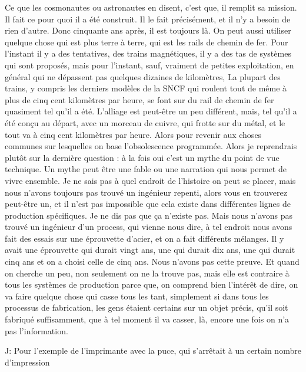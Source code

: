 \begin{description}
Ce que les cosmonautes ou astronautes en disent, c'est que, il remplit sa mission. Il fait ce pour quoi il a été construit. Il le fait précisément, et il n'y a besoin de rien d'autre. Donc cinquante ans après, il est toujours là. 
On peut aussi utiliser quelque chose qui est plus terre à terre, qui est les rails de chemin de fer. Pour l'instant il y a des tentatives, des trains magnétiques, il y a des tas de systèmes qui sont proposés, mais pour l'instant, sauf, vraiment de petites exploitation, en général qui ne dépassent pas quelques dizaines de kilomètres, La plupart des trains, y compris les derniers modèles de la SNCF qui roulent tout de même à plus de cinq cent kilomètres par heure, se font sur du rail de chemin de fer quasiment tel qu'il a été. L'alliage est peut-être un peu différent, mais, tel qu'il a été conçu au départ, avec un morceau de cuivre, qui frotte sur du métal, et le tout va à  cinq cent kilomètres par heure. 
Alors pour revenir aux choses communes sur lesquelles on base l'obsolescence programmée. Alors je reprendrais plutôt sur la dernière question : à la fois oui c'est un mythe du point de vue technique. Un mythe peut être une fable ou une narration qui nous permet de vivre ensemble. Je ne sais pas à quel endroit de l'histoire on peut se placer, mais nous n'avons toujours pas trouvé un ingénieur repenti, alors vous en trouverez peut-être un, et il n'est pas impossible que cela existe dans différentes lignes de production spécifiques. Je ne dis pas que ça n'existe pas. Mais nous n'avons pas trouvé un ingénieur d'un process, qui vienne nous dire, à tel endroit nous avons fait des essais sur une éprouvette d'acier, et on a fait différents mélanges. Il y avait une éprouvette qui durait vingt ans, une qui durait dix ans, une qui durait cinq ans et on a choisi celle de cinq ans. Nous n'avons pas cette  preuve. Et quand on cherche un peu, non seulement on ne la trouve pas, mais elle est contraire à tous les systèmes de production parce que, on comprend bien l’intérêt de dire, on va faire quelque chose qui casse tous les tant, simplement si dans tous les processus de fabrication, les gens étaient certains sur un objet précis, qu'il soit fabriqué suffisamment, que à tel moment il va casser, là, encore une fois on n'a pas l'information.

\vspace{1\baselineskip}

J: Pour l'exemple de l'imprimante avec la puce, qui s'arrêtait à un certain nombre d'impression

\vspace{1\baselineskip}


\end{description}
